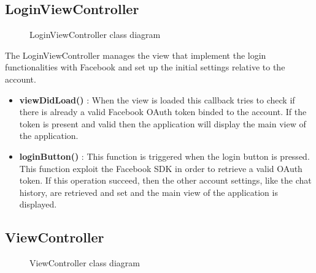 \subsection{LoginViewController} 
\begin{figure}[H]
\caption{LoginViewController class diagram}
\end{figure}

The LoginViewController manages the view that implement the login functionalities with Facebook and set up the initial settings relative to the account.

\begin{itemize}
\item \textbf{viewDidLoad()} : When the view is loaded this callback tries to check if there is already a valid Facebook OAuth token binded to the account. If the token is present and valid then the application will display the main view of the application.
\item \textbf{loginButton()} : This function is triggered when the login button is pressed. This function exploit the Facebook SDK in order to retrieve a valid OAuth token. If this operation succeed, then the other account settings, like the chat history, are retrieved and set and the main view of the application is displayed.
\end{itemize}


\subsection{ViewController} 
\begin{figure}[H]
\caption{ViewController class diagram}
\end{figure}


